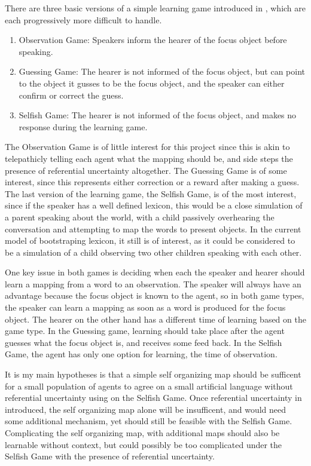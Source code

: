 \documentclass[a4paper,11pt]{article}
\begin{document}
There are three basic versions of a simple learning game introduced in
\cite{VogtLearningSim}, which are each progressively more difficult to handle.

\begin{enumerate}

\item Observation Game: Speakers inform the hearer of the focus object before
speaking.

\item Guessing Game: The hearer is not informed of the focus object, but can
point to the object it gusses to be the focus object, and the speaker can either
confirm or correct the guess.

\item Selfish Game: The hearer is not informed of the focus object, and makes no
response during the learning game.

\end{enumerate}

The Observation Game is of little interest for this project since this is akin
to telepathicly telling each agent what the mapping should be, and side steps
the presence of referential uncertainty altogether.  The Guessing Game is of
some interest, since this represents either correction or a reward after making
a guess.  The last version of the learning game, the Selfish Game, is of the
most interest, since if the speaker has a well defined lexicon, this would be a
close simulation of a parent speaking about the world, with a child passively
overhearing the conversation and attempting to map the words to present objects.
In the current model of bootstraping lexicon, it still is of interest, as it
could be considered to be a simulation of a child observing two other children
speaking with each other.

One key issue in both games is deciding when each the speaker and hearer should
learn a mapping from a word to an observation.  The speaker will always have an
advantage because the focus object is known to the agent, so in both game types,
the speaker can learn a mapping as soon as a word is produced for the focus
object.  The hearer on the other hand has a different time of learning based on
the game type.  In the Guessing game, learning should take place after the agent
guesses what the focus object is, and receives some feed back.  In the Selfish
Game, the agent has only one option for learning, the time of observation.

It is my main hypotheses is that a simple self organizing map should be
sufficent for a small population of agents to agree on a small artificial
language without referential uncertainty using on the Selfish Game.  Once
referential uncertainty in introduced, the self organizing map alone will be
insufficent, and would need some additional mechanism, yet should still be
feasible with the Selfish Game.  Complicating the self organizing map, with
additional maps should also be learnable without context, but could possibly be
too complicated under the Selfish Game with the presence of referential
uncertainty.
\end{document}
